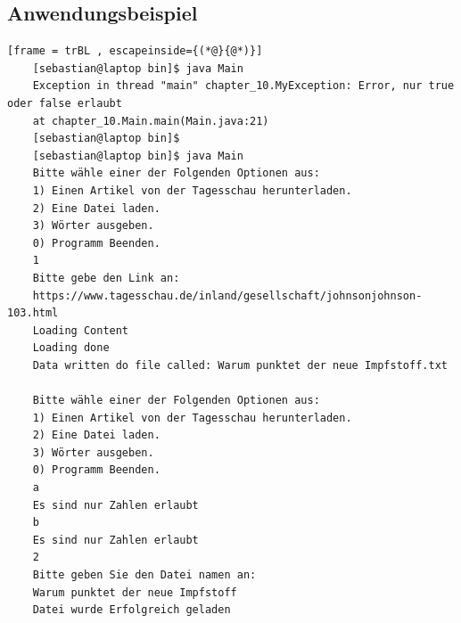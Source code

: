 \subsection{Anwendungsbeispiel}
\begin{lstlisting}[frame = trBL , escapeinside={(*@}{@*)}]
	[sebastian@laptop bin]$ java Main 	
	Exception in thread "main" chapter_10.MyException: Error, nur true oder false erlaubt
	at chapter_10.Main.main(Main.java:21)
	[sebastian@laptop bin]$ 
	[sebastian@laptop bin]$ java Main 
	Bitte wähle einer der Folgenden Optionen aus:
	1) Einen Artikel von der Tagesschau herunterladen.
	2) Eine Datei laden.
	3) Wörter ausgeben.
	0) Programm Beenden.
	1
	Bitte gebe den Link an:
	https://www.tagesschau.de/inland/gesellschaft/johnsonjohnson-103.html
	Loading Content
	Loading done
	Data written do file called: Warum punktet der neue Impfstoff.txt
	
	Bitte wähle einer der Folgenden Optionen aus:
	1) Einen Artikel von der Tagesschau herunterladen.
	2) Eine Datei laden.
	3) Wörter ausgeben.
	0) Programm Beenden.
	a
	Es sind nur Zahlen erlaubt
	b
	Es sind nur Zahlen erlaubt
	2
	Bitte geben Sie den Datei namen an:
	Warum punktet der neue Impfstoff
	Datei wurde Erfolgreich geladen
	

\end{lstlisting}
